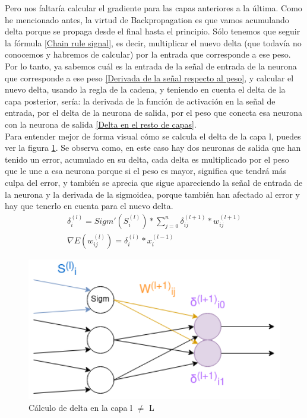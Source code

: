 Pero nos faltaría calcular el gradiente para las capas anteriores a la última. Como he mencionado antes, la virtud de Backpropagation es que vamos acumulando delta porque se propaga desde el final hasta el principio. Sólo tenemos que seguir la fórmula \ref{Chain rule signal}, es decir, multiplicar el nuevo delta (que todavía no conocemos y habremos de calcular) por la entrada que corresponde a ese peso. 
\\
Por lo tanto, ya sabemos cuál es la entrada de la señal  de entrada de la neurona que corresponde a ese peso \ref{Derivada de la señal respecto al peso}, y calcular el nuevo delta, usando la regla de la cadena, y teniendo en cuenta el delta de la capa posterior, sería: la derivada de la función de activación en la señal de entrada, por el delta de la neurona de salida, por el peso que conecta esa neurona con la neurona de salida \ref{Delta en el resto de capas}. 
\\
Para entender mejor de forma visual cómo se calcula el delta de la capa l, puedes ver la figura \ref{Delta en la capa l}. Se observa como, en este caso hay dos neuronas de salida que han tenido un error, acumulado en su delta, cada delta es multiplicado por el peso que le une a esa neurona porque si el peso es mayor, significa que tendrá más culpa del error, y también se aprecia que sigue apareciendo la señal de entrada de la neurona y la derivada de la sigmoidea, porque también han afectado al error y hay que tenerlo en cuenta para el nuevo delta.
\begin{subequations}
	\begin{eqnarray}
		\delta_{i}^{(l)} = Sigm'(S_{i}^{(l)}) * \sum_{j=0}^{n} \delta_{ij}^{(l+1)} * w_{ij}^{(l+1)} \label{Delta en el resto de capas} \\
		\nabla E(w_{ij}^{(l)}) = \delta_{i}^{(l)}  * x_{i}^{(l-1)} \label{Gradiente para las neuronas del resto de capas}
	\end{eqnarray}
\end{subequations}

\begin{figure}[h]
	\centering
	\includegraphics[width=15cm]{archivos/imagenes/Calculo-del-delta-en-la-capa-l.png}
	\caption{Cálculo de delta en la capa l $\neq$ L}
	\label{Delta en la capa l}
\end{figure}

